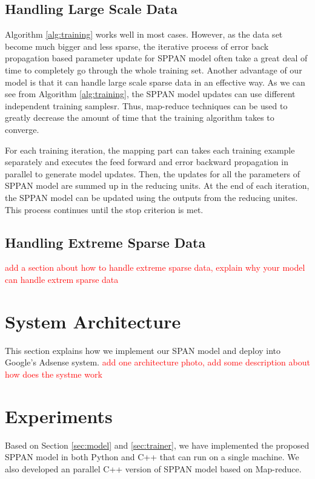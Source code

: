 \documentclass[conference,compsoc]{IEEEtran}
\begin{document}
\subsection{Handling Large Scale  Data}
Algorithm \ref{alg:training} works well in most cases. However, as the data set become much bigger and less sparse, the iterative process of error back propagation based parameter update for SPPAN model often take a great deal of time to completely go through the whole training set. 
Another advantage of our model is that it can handle large scale sparse data in an effective way. As we can see from Algorithm \ref{alg:training}, the SPPAN model updates can use different independent training samplesr. Thus, map-reduce techniques can be used to greatly decrease the amount of time that the training algorithm takes to converge. 

For each training iteration, the mapping part can takes each training example separately and executes the feed forward and error backward propagation in parallel to generate model updates. Then, the updates for all the parameters of SPPAN model are summed up in the reducing units. At the end of each iteration, the SPPAN model can be updated using the outputs from the reducing unites. This process continues until the stop criterion is met.


\subsection{Handling Extreme Sparse Data}
\textcolor{red}{add a section about how to handle extreme sparse data, explain why your model can handle extrem sparse data}


\section{System Architecture}
\label{sec:archi}
This section explains how we implement our SPAN model and deploy into Google's Adsense system.
\textcolor{red} {add one architecture photo,  add some description about how does the systme work}

%
\section{Experiments}
\label{sec:exp}
Based on Section \ref{sec:model} and \ref{sec:trainer}, we have implemented the proposed SPPAN model in both Python and C++ that can run on a single machine. We also developed an parallel C++ version of SPPAN model based on Map-reduce. 
\end{document}
